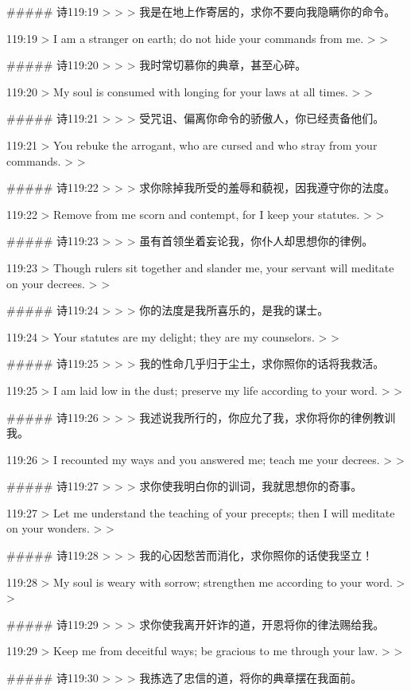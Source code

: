 ##### 诗119:19
> 
>
> 我是在地上作寄居的，求你不要向我隐瞒你的命令。


119:19
> I am a stranger on earth; do not hide your commands from me.
>
> 


##### 诗119:20
> 
>
> 我时常切慕你的典章，甚至心碎。


119:20
> My soul is consumed with longing for your laws at all times.
>
> 


##### 诗119:21
> 
>
> 受咒诅、偏离你命令的骄傲人，你已经责备他们。


119:21
> You rebuke the arrogant, who are cursed and who stray from your commands.
>
> 


##### 诗119:22
> 
>
> 求你除掉我所受的羞辱和藐视，因我遵守你的法度。


119:22
> Remove from me scorn and contempt, for I keep your statutes.
>
> 


##### 诗119:23
> 
>
> 虽有首领坐着妄论我，你仆人却思想你的律例。


119:23
> Though rulers sit together and slander me, your servant will meditate on your decrees.
>
> 


##### 诗119:24
> 
>
> 你的法度是我所喜乐的，是我的谋士。


119:24
> Your statutes are my delight; they are my counselors.
>
> 


##### 诗119:25
> 
>
> 我的性命几乎归于尘土，求你照你的话将我救活。


119:25
> I am laid low in the dust; preserve my life according to your word.
>
> 


##### 诗119:26
> 
>
> 我述说我所行的，你应允了我，求你将你的律例教训我。


119:26
> I recounted my ways and you answered me; teach me your decrees.
>
> 


##### 诗119:27
> 
>
> 求你使我明白你的训词，我就思想你的奇事。


119:27
> Let me understand the teaching of your precepts; then I will meditate on your wonders.
>
> 


##### 诗119:28
> 
>
> 我的心因愁苦而消化，求你照你的话使我坚立！


119:28
> My soul is weary with sorrow; strengthen me according to your word.
>
> 


##### 诗119:29
> 
>
> 求你使我离开奸诈的道，开恩将你的律法赐给我。


119:29
> Keep me from deceitful ways; be gracious to me through your law.
>
> 


##### 诗119:30
> 
>
> 我拣选了忠信的道，将你的典章摆在我面前。


